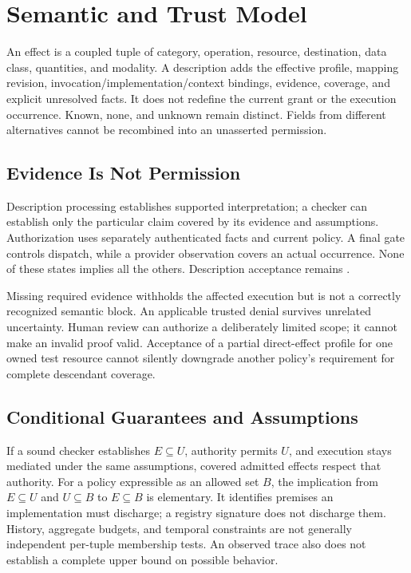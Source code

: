 \documentclass[11pt,letterpaper]{article}
\newcommand{\code}[1]{\texttt{\detokenize{#1}}}
\begin{document}
\section{Semantic and Trust Model}

An effect is a coupled tuple of category, operation, resource, destination,
data class, quantities, and modality. A description adds the effective profile,
mapping revision, invocation/implementation/context bindings, evidence, coverage,
and explicit unresolved facts. It does not redefine the current grant or the
execution occurrence. Known, none, and unknown remain distinct. Fields from
different alternatives cannot be recombined into an unasserted permission.

\subsection{Evidence Is Not Permission}

Description processing establishes supported interpretation; a checker can
establish only the particular claim covered by its evidence and assumptions.
Authorization uses separately authenticated facts and current policy. A final
gate controls dispatch, while a provider observation covers an actual occurrence.
None of these states implies all the others. Description acceptance remains
\code{authority: not_evaluated}.

Missing required evidence withholds the affected execution but is not a
correctly recognized semantic block. An applicable trusted denial survives
unrelated uncertainty. Human review can authorize a deliberately limited scope;
it cannot make an invalid proof valid. Acceptance of a partial direct-effect
profile for one owned test resource cannot silently downgrade another policy's
requirement for complete descendant coverage.

\subsection{Conditional Guarantees and Assumptions}

If a sound checker establishes $E\subseteq U$, authority permits $U$, and
execution stays mediated under the same assumptions, covered admitted effects
respect that authority. For a policy expressible as an allowed set $B$, the
implication from $E\subseteq U$ and $U\subseteq B$ to $E\subseteq B$ is elementary.
It identifies premises an implementation must discharge; a registry signature
does not discharge them.
History, aggregate budgets, and temporal constraints are not generally
independent per-tuple membership tests. An observed trace also does not establish
a complete upper bound on possible behavior.
\end{document}
